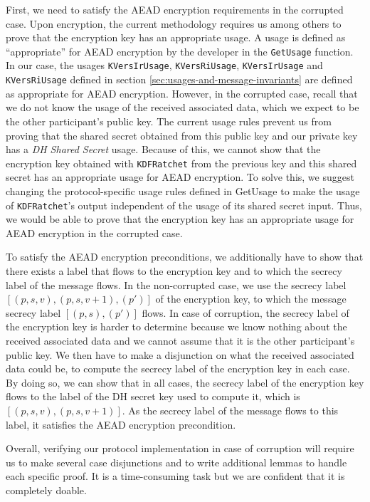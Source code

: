 First, we need to satisfy the AEAD encryption requirements in the corrupted case.
Upon encryption, the current methodology requires us among others to prove that the encryption key has an appropriate usage.
A usage is defined as “appropriate” for AEAD encryption by the developer in the \texttt{GetUsage} function.
In our case, the usages \texttt{KVersIrUsage}, \texttt{KVersRiUsage}, \texttt{KVersIrUsage} and \texttt{KVersRiUsage} defined in section \ref{sec:usages-and-message-invariants} are defined as appropriate for AEAD encryption.
However, in the corrupted case, recall that we do not know the usage of the received associated data, which we expect to be the other participant's public key.
The current usage rules prevent us from proving that the shared secret obtained from this public key and our private key has a \emph{DH Shared Secret} usage.
Because of this, we cannot show that the encryption key obtained with \texttt{KDFRatchet} from the previous key and this shared secret has an appropriate usage for AEAD encryption.
To solve this, we suggest changing the protocol-specific usage rules defined in GetUsage to make the usage of \texttt{KDFRatchet}'s output independent of the usage of its shared secret input.
Thus, we would be able to prove that the encryption key has an appropriate usage for AEAD encryption in the corrupted case.

To satisfy the AEAD encryption preconditions, we additionally have to show that there exists a label that flows to the encryption key and to which the secrecy label of the message flows.
In the non-corrupted case, we use the secrecy label $[(p,s,v),(p,s,v+1),(p')]$ of the encryption key, to which the message secrecy label $[(p,s),(p')]$ flows.
In case of corruption, the secrecy label of the encryption key is harder to determine because we know nothing about the received associated data and we cannot assume that it is the other participant's public key.
We then have to make a disjunction on what the received associated data could be, to compute the secrecy label of the encryption key in each case.
By doing so, we can show that in all cases, the secrecy label of the encryption key flows to the label of the DH secret key used to compute it, which is $[(p,s,v),(p,s,v+1)]$. As the secrecy label of the message flows to this label, it satisfies the AEAD encryption precondition.

Overall, verifying our protocol implementation in case of corruption will require us to make several case disjunctions and to write additional lemmas to handle each specific proof.
It is a time-consuming task but we are confident that it is completely doable.

